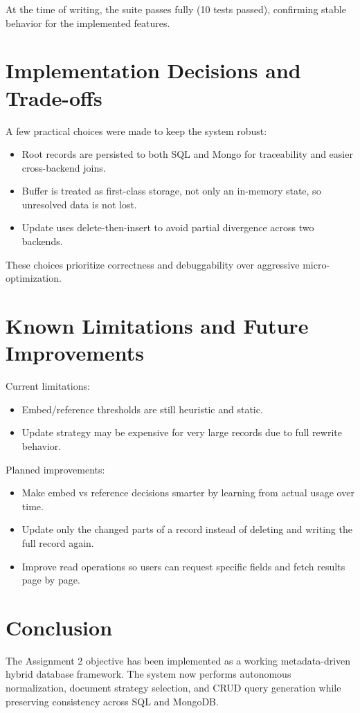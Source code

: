 \documentclass[12pt,a4paper]{article}
\begin{document}
At the time of writing, the suite passes fully (10 tests passed), confirming stable behavior for the implemented features.

\section{Implementation Decisions and Trade-offs}
A few practical choices were made to keep the system robust:
\begin{itemize}[leftmargin=*]
  \item Root records are persisted to both SQL and Mongo for traceability and easier cross-backend joins.
  \item Buffer is treated as first-class storage, not only an in-memory state, so unresolved data is not lost.
  \item Update uses delete-then-insert to avoid partial divergence across two backends.
\end{itemize}

These choices prioritize correctness and debuggability over aggressive micro-optimization.

\section{Known Limitations and Future Improvements}
Current limitations:
\begin{itemize}[leftmargin=*]
  \item Embed/reference thresholds are still heuristic and static.
  \item Update strategy may be expensive for very large records due to full rewrite behavior.
\end{itemize}

Planned improvements:
\begin{itemize}[leftmargin=*]
  \item Make embed vs reference decisions smarter by learning from actual usage over time.
  \item Update only the changed parts of a record instead of deleting and writing the full record again.
  \item Improve read operations so users can request specific fields and fetch results page by page.
\end{itemize}

\section{Conclusion}
The Assignment 2 objective has been implemented as a working metadata-driven hybrid database framework. The system now performs autonomous normalization, document strategy selection, and CRUD query generation while preserving consistency across SQL and MongoDB.
\end{document}
